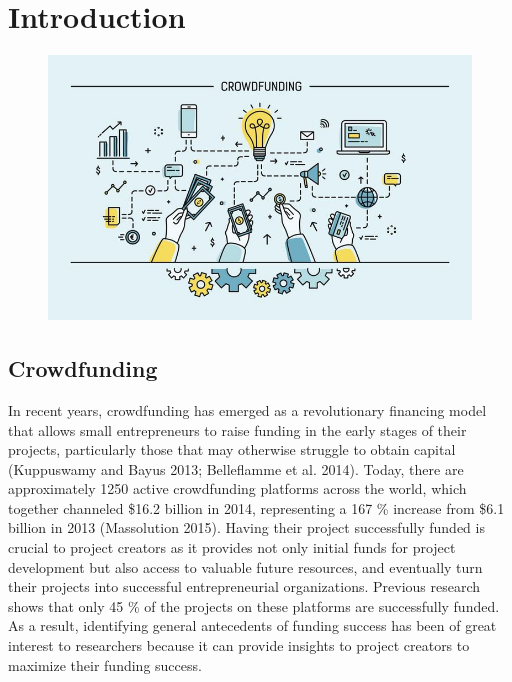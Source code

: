 

\setcounter{mtc}{6}

\chapter*{Introduction}
\label{chap:general_intorduction}
\minitoc
{}%
%
\begin{figure}[!ht]
      \center
      \includegraphics[scale=0.55]{assets/crowdfunding.jpg}
      \label{fig:cwdfnd}
\end{figure}

\section*{Crowdfunding}
In recent years, crowdfunding has emerged as a revolutionary financing model that allows small entrepreneurs to raise funding in the early stages of their projects, particularly those that may otherwise struggle to obtain capital (Kuppuswamy and Bayus 2013; Belleflamme et al. 2014). Today, there are approximately 1250 active crowdfunding platforms across the world, which together channeled \$16.2 billion in 2014, representing a 167 \% increase from \$6.1 billion in 2013 (Massolution 2015). Having their project successfully funded is crucial to project creators as it provides not only initial funds for project development but also access to valuable future resources, and eventually turn their projects into successful entrepreneurial organizations. Previous research shows that only 45 \% of the projects on these platforms are successfully funded. As a result, identifying general antecedents of funding success has been of great interest to researchers because it can provide insights to project creators to maximize their funding success.

